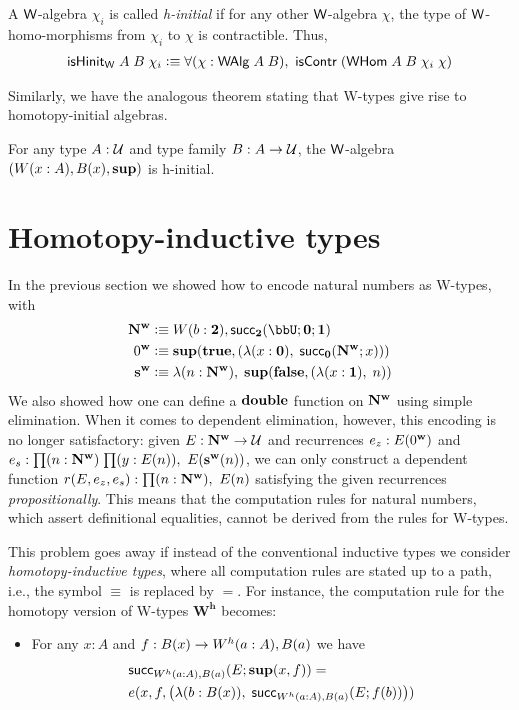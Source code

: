 \begin{defn}
A $\mathsf{W}$-algebra $\chi_i$ is called \emph{h-initial} if for any other $\mathsf{W}$-algebra $\chi$, the type of $\mathsf{W}$-homo-morphisms from $\chi_i$ to $\chi$ is contractible. Thus,
\begin{align*}
\ishinitw \; A \; B \; \chi_i \defeq \fall{\chi : \walg \; A \; B} \iscontr \; (\whom \; A \; B \; \chi_i\; \chi)
\end{align*}
\end{defn}

Similarly, we have the analogous theorem stating that W-types give rise to homotopy-initial algebras.
\begin{thm}
For any type $A : \mathcal{U}$ and type family $B : A \to \mathcal{U}$, the $\mathsf{W}$-algebra $(W(x:A),{B(x)}, \mathbf{sup})$ is h-initial.
\end{thm}



\section{Homotopy-inductive types}
In the previous section we showed how to encode natural numbers as W-types, with 
\begin{align*}
\natw & \defeq \wtype{b:\two} \rec_\two(\bbU;\zero;\one) \\
\zw & \defeq \supp(\true, (\lambda (x : \zero), \; \rec_\zero(\natw;x))) \\
\sw & \defeq \lambda (n : \natw), \; \supp(\false, (\lambda (x : \one), \; n))
\end{align*}
We also showed how one can define a $\mathbf{double}$ function on $\mathbf{N^w}$ using simple elimination. When it comes to dependent elimination, however, this encoding is no longer satisfactory: given $E : \mathbf{N^w} \to \mathcal{U}$ and recurrences $e_z : E(0^\mathbf{w})$ and $e_s : \prd{n : \natw}{y : E(n)} E(\sw(n))$, we can only construct a dependent function $r(E,e_z,e_s) : \prd{n : \natw} E(n)$ satisfying the given recurrences \emph{propositionally}. This means that the computation rules for natural numbers, which assert definitional equalities, cannot be derived from the rules for W-types.

This problem goes away if instead of the conventional inductive types we consider \emph{homotopy-inductive types}, where all computation rules are stated up to a path, i.e., the symbol $\equiv$ is replaced by $=$. For instance, the computation rule for the homotopy version of W-types $\mathbf{W^h}$ becomes:
\begin{itemize}
\item For any $x : A$ and $f : B(x) \to W^h(a:A), B(a)$ we have 
\begin{align*}
& \mathsf{succ}_{W^h(a:A), B(a)}(E;\mathbf{sup}(x,f)) = \\ & e(x,f,\big(\lambda (b : B(x)), \; \mathsf{succ}_{W^h(a:A), B(a)}(E;f(b))\big))
\end{align*}
\end{itemize}

